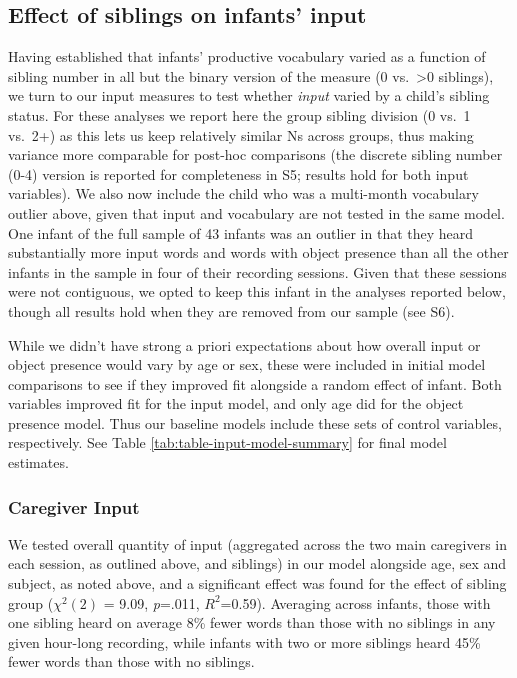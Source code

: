 \documentclass[
  man,mask,floatsintext]{apa6}
\begin{document}
\hypertarget{effect-of-siblings-on-infants-input}{%
\subsection{Effect of siblings on infants' input}\label{effect-of-siblings-on-infants-input}}

Having established that infants' productive vocabulary varied as a function of sibling number in all but the binary version of the measure (0 vs.~\textgreater0 siblings), we turn to our input measures to test whether \emph{input} varied by a child's sibling status. For these analyses we report here the group sibling division (0 vs.~1 vs.~2+) as this lets us keep relatively similar Ns across groups, thus making variance more comparable for post-hoc comparisons (the discrete sibling number (0-4) version is reported for completeness in S5; results hold for both input variables). We also now include the child who was a multi-month vocabulary outlier above, given that input and vocabulary are not tested in the same model. One infant of the full sample of 43 infants was an outlier in that they heard substantially more input words and words with object presence than all the other infants in the sample in four of their recording sessions. Given that these sessions were not contiguous, we opted to keep this infant in the analyses reported below, though all results hold when they are removed from our sample (see S6).

While we didn't have strong a priori expectations about how overall input or object presence would vary by age or sex, these were included in initial model comparisons to see if they improved fit alongside a random effect of infant. Both variables improved fit for the input model, and only age did for the object presence model. Thus our baseline models include these sets of control variables, respectively. See Table \ref{tab:table-input-model-summary} for final model estimates.

\hypertarget{caregiver-input}{%
\subsubsection{Caregiver Input}\label{caregiver-input}}

We tested overall quantity of input (aggregated across the two main caregivers in each session, as outlined above, and siblings) in our model alongside age, sex and subject, as noted above, and a significant effect was found for the effect of sibling group (\(\chi^2 (2)\) = 9.09, \emph{p}=.011, \(R^2\)=0.59). Averaging across infants, those with one sibling heard on average 8\% fewer words than those with no siblings in any given hour-long recording, while infants with two or more siblings heard 45\% fewer words than those with no siblings.
\end{document}
